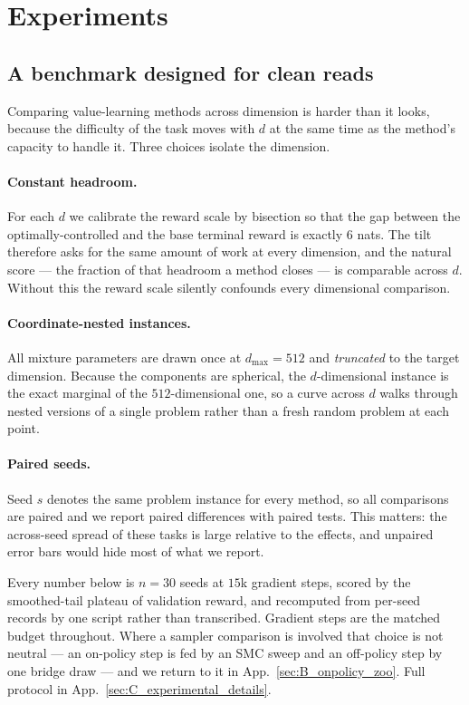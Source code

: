 \section{Experiments}
\label{sec:07_experiments}

\subsection{A benchmark designed for clean reads}
\label{subsec:design}

Comparing value-learning methods across dimension is harder than it looks,
because the difficulty of the task moves with $d$ at the same time as the
method's capacity to handle it. Three choices isolate the dimension.

\paragraph{Constant headroom.}
For each $d$ we calibrate the reward scale by bisection so that the gap between
the optimally-controlled and the base terminal reward is exactly $6$ nats. The
tilt therefore asks for the same amount of work at every dimension, and the
natural score --- the fraction of that headroom a method closes --- is
comparable across $d$. Without this the reward scale silently confounds every
dimensional comparison.

\paragraph{Coordinate-nested instances.}
All mixture parameters are drawn once at $d_{\max}=512$ and \emph{truncated} to
the target dimension. Because the components are spherical, the $d$-dimensional
instance is the exact marginal of the $512$-dimensional one, so a curve across
$d$ walks through nested versions of a single problem rather than a fresh
random problem at each point.

\paragraph{Paired seeds.}
Seed $s$ denotes the same problem instance for every method, so all comparisons
are paired and we report paired differences with paired tests. This matters:
the across-seed spread of these tasks is large relative to the effects, and
unpaired error bars would hide most of what we report.

Every number below is $n=30$ seeds at $15$k gradient steps, scored by the
smoothed-tail plateau of validation reward, and recomputed from per-seed
records by one script rather than transcribed. Gradient steps are the matched
budget throughout. Where a sampler comparison is involved that choice is not
neutral --- an on-policy step is fed by an SMC sweep and an off-policy step by
one bridge draw --- and we return to it in App.~\ref{sec:B_onpolicy_zoo}. Full
protocol in
App.~\ref{sec:C_experimental_details}.

